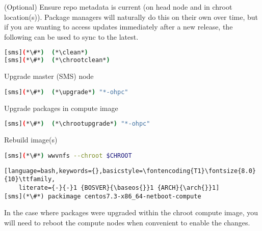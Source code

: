 \begin{enumerate*}
\item (Optional) Ensure repo metadata is current (on head node and in chroot
  location(s)). Package managers will naturally do this on their own over time,
  but if you are wanting to access updates immediately after a new release,
  the following can be used to sync to the latest.

\begin{lstlisting}[language=bash,keywords={}]
[sms](*\#*)  (*\clean*)
[sms](*\#*)  (*\chrootclean*)
\end{lstlisting}

\item Upgrade master (SMS) node

\begin{lstlisting}[language=bash,keywords={}]
[sms](*\#*)  (*\upgrade*) "*-ohpc"
\end{lstlisting}
  
\item Upgrade packages in compute image

\begin{lstlisting}[language=bash,keywords={}]
[sms](*\#*)  (*\chrootupgrade*) "*-ohpc"
\end{lstlisting}
  
\item Rebuild image(s)

\begin{lstlisting}[language=bash,keywords={}]
[sms](*\#*) wwvnfs --chroot $CHROOT
\end{lstlisting}
\fi

\begin{lstlisting}[language=bash,keywords={},basicstyle=\fontencoding{T1}\fontsize{8.0}{10}\ttfamily,
    literate={-}{-}1 {BOSVER}{\baseos{}}1 {ARCH}{\arch{}}1]
[sms](*\#*) packimage centos7.3-x86_64-netboot-compute
\end{lstlisting}
\fi

\end{enumerate*}

\noindent In the case where packages were upgraded within the chroot compute image,
you will need to reboot the compute nodes when convenient to enable the
changes.

